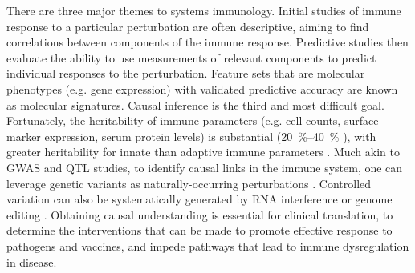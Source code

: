 There are three major themes to systems immunology.
Initial studies of immune response to a particular perturbation are often descriptive,
aiming to find correlations between components of the immune response.
Predictive studies then evaluate the ability to use measurements of relevant components to predict individual responses to the perturbation.
Feature sets that are molecular phenotypes (e.g. gene expression) with validated predictive accuracy are known as molecular signatures.
Causal inference is the third and most difficult goal.
Fortunately, the heritability of immune parameters (e.g. cell counts, surface marker expression, serum protein levels) is substantial (\SIrange{20}{40}{\percent} \autocite{liston2016ShapingVariationHuman,brodin2017HumanImmuneSystem,patin2018NaturalVariationParameters,liston2018OriginsDiversityHuman}),
with greater heritability for innate than adaptive immune parameters \autocite{patin2018NaturalVariationParameters}.
Much akin to \gls{GWAS} and \gls{QTL} studies, to identify causal links in the immune system,
one can leverage genetic variants as naturally-occurring perturbations \autocite{tsang2015UtilizingPopulationVariation,villani2018SystemsImmunologyLearning}.
Controlled variation can also be systematically generated by RNA interference or genome editing \autocite{yosef2016WritLargeGenomic}.
Obtaining causal understanding is essential for clinical translation,
to determine the interventions that can be made to promote effective response to pathogens and vaccines,
and impede pathways that lead to immune dysregulation in disease.
%

